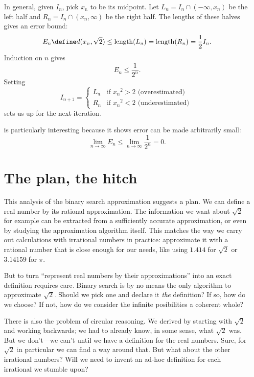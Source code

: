 \documentclass{scrartcl}
\newcommand{\dist}{d}
\newcommand{\length}{\mathrm{length}}
\begin{document}
\begin{example}
  In general, given \(I_{n}\), pick \(x_{n}\) to be its midpoint. Let \(L_{n}=I_{n} \cap (-\infty, x_{n})\) be the left half and \(R_{n}=I_{n}\cap (x_{n},\infty)\) be the right half. The lengths of these halves gives an error bound:
  \[
    E_{n} \define \dist(x_{n},\sqrt 2) \leq \length(L_{n}) = \length(R_{n}) = \frac12 I_{n}.
  \]
  Induction on $n$ gives
  \begin{equation}
    E_{n} \leq \frac{1}{2^{n}}.\label{eq:binary search error bound}
  \end{equation}
  Setting
  \[
    I_{n+1} =
    \begin{cases}
      L_{n}& \textrm{if } {x_{n}}^{2} > 2 \textrm{ (overestimated)}\\
      R_{n}& \textrm{if } {x_{n}}^{2} < 2 \textrm{ (underestimated) }
    \end{cases}
  \]
  sets us up for the next iteration.

   is particularly interesting because it shows error can be made arbitrarily small:
  \[
    \lim_{n\to\infty} E_{n} \leq \lim_{n\to\infty}\frac{1}{2^{n}} =0.
  \]
\end{example}

\section{The plan, the hitch}
This analysis of the binary search approximation suggests a plan. We can define a real number by its rational approximation. The information we want about \(\sqrt 2\) for example can be extracted from a sufficiently accurate approximation, or even by studying the approximation algorithm itself. This matches the way we carry out calculations with irrational numbers in practice: approximate it with a rational number that is close enough for our needs, like using \(1.414\) for \(\sqrt 2\) or \(3.14159\) for \(\pi\).

But to turn ``represent real numbers by their approximations'' into an exact definition requires care. Binary search is by no means the only algorithm to approximate \(\sqrt 2\). Should we pick one and declare it \emph{the} definition? If so, how do we choose? If not, how do we consider the infinite posibilities a coherent whole?

There is also the problem of circular reasoning. We derived  by starting with \(\sqrt 2\) and working backwards; we had to already know, in some sense, what \(\sqrt 2\) was. But we don't---we can't until we have a definition for the real numbers. Sure, for \(\sqrt 2\) in particular we can find a way around that. But what about the other irrational numbers? Will we need to invent an ad-hoc definition for each irrational we stumble upon?
\end{document}
